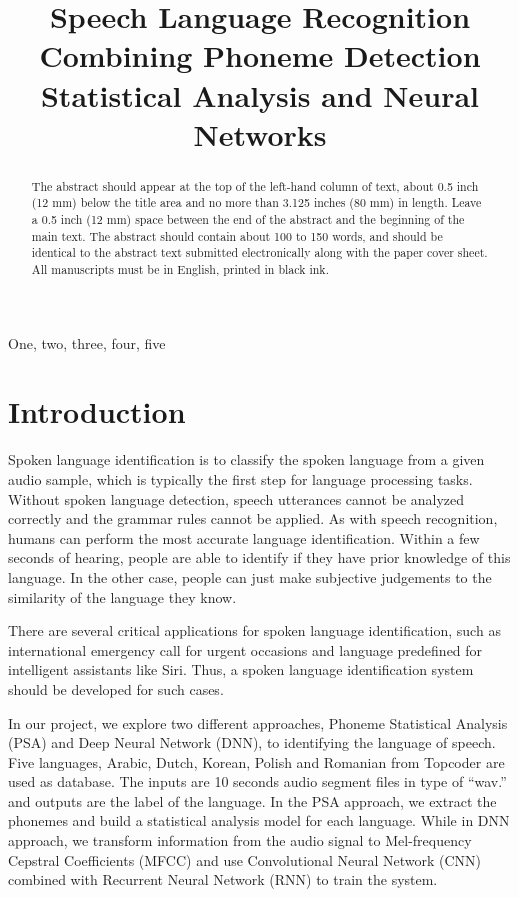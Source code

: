 \documentclass{article}
\title{Speech Language Recognition Combining Phoneme Detection Statistical Analysis and Neural Networks}
\begin{document}
%
\maketitle
%
\begin{abstract}
The abstract should appear at the top of the left-hand column of text, about
0.5 inch (12 mm) below the title area and no more than 3.125 inches (80 mm) in
length.  Leave a 0.5 inch (12 mm) space between the end of the abstract and the
beginning of the main text.  The abstract should contain about 100 to 150
words, and should be identical to the abstract text submitted electronically
along with the paper cover sheet.  All manuscripts must be in English, printed
in black ink.
\end{abstract}
%
\begin{keywords}
One, two, three, four, five
\end{keywords}
%
\section{Introduction}
\label{sec:intro}
Spoken language identification is to classify the spoken language from a given audio sample, which is typically the first step for language processing tasks. Without spoken language detection, speech utterances cannot be analyzed correctly and the grammar rules cannot be applied. As with speech recognition, humans can perform the most accurate language identification. Within a few seconds of hearing, people are able to identify if they have prior knowledge of this language. In the other case, people can just make subjective judgements to the similarity of the language they know.

There are several critical applications for spoken language identification, such as international emergency call for urgent occasions and language predefined for intelligent assistants like Siri. 
Thus, a spoken language identification system should be developed for such cases.

In our project, we explore two different approaches, Phoneme Statistical Analysis (PSA) and Deep Neural Network (DNN), to identifying the language of speech. Five languages, Arabic, Dutch, Korean, Polish and Romanian from Topcoder are used as database. The inputs are 10  seconds audio segment files in type of “wav.” and outputs are the label of the language. In the PSA approach, we extract the phonemes and build a statistical analysis model for each language. While in DNN approach, we transform information from the audio signal to Mel-frequency Cepstral Coefficients (MFCC) and use Convolutional Neural Network (CNN) combined with Recurrent Neural Network (RNN) to train the system.
\end{document}
